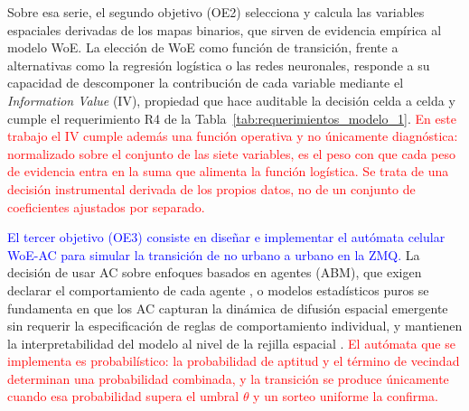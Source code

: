 Sobre esa serie, el segundo objetivo (OE2) selecciona y calcula las variables espaciales derivadas de los mapas binarios, que sirven de evidencia empírica al modelo WoE. La elección de WoE como función de transición, frente a alternativas como la regresión logística o las redes neuronales, responde a su capacidad de descomponer la contribución de cada variable mediante el \textit{Information Value} (IV), propiedad que hace auditable la decisión celda a celda y cumple el requerimiento R4 de la Tabla~\ref{tab:requerimientos_modelo_1}. \textcolor{red}{En este trabajo el IV cumple además una función operativa y no únicamente diagnóstica: normalizado sobre el conjunto de las siete variables, es el peso con que cada peso de evidencia entra en la suma que alimenta la función logística. Se trata de una decisión instrumental derivada de los propios datos, no de un conjunto de coeficientes ajustados por separado.}



\textcolor{blue}{El tercer objetivo (OE3) consiste en diseñar e implementar el autómata celular WoE-AC para simular la transición de no urbano a urbano en la ZMQ.} La decisión de usar AC sobre enfoques basados en agentes (ABM), que exigen declarar el comportamiento de cada agente \parencite{Li2007}, o modelos estadísticos puros se fundamenta en que los AC capturan la dinámica de difusión espacial emergente sin requerir la especificación de reglas de comportamiento individual, y mantienen la interpretabilidad del modelo al nivel de la rejilla espacial \parencite{Clarke1998,Sante2010,Batty2005}. \textcolor{red}{El autómata que se implementa es probabilístico: la probabilidad de aptitud y el término de vecindad determinan una probabilidad combinada, y la transición se produce únicamente cuando esa probabilidad supera el umbral $\theta$ y un sorteo uniforme la confirma.}



